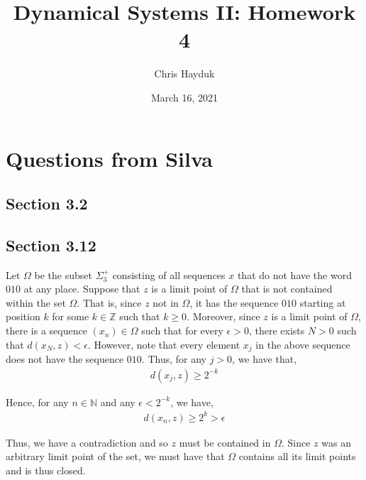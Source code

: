 \documentclass[12pt]{article}
\newenvironment{problem}[2][Problem]{\begin{trivlist}
\item[\hskip \labelsep {\bfseries #1}\hskip \labelsep {\bfseries #2.}]}{\end{trivlist}}
\begin{document}
\title{Dynamical Systems II: Homework 4}

\author{Chris Hayduk}
\date{March 16, 2021}

\maketitle

\section{Questions from Silva}

\subsection{Section 3.2}

\begin{problem}{10}
\end{problem}

\subsection{Section 3.12}

\begin{problem}{2}
\end{problem}

Let $\Omega$ be the subset $\Sigma^+_3$ consisting of all sequences $x$ that do not have the word $010$ at any place. Suppose that $z$ is a limit point of $\Omega$ that is not contained within the set $\Omega$. That is, since $z$ not in $\Omega$, it has the sequence $010$ starting at position $k$ for some $k \in \mathbb{Z}$ such that $k \geq 0$. Moreover, since $z$ is a limit point of $\Omega$, there is a sequence $(x_n) \in \Omega$ such that for every $\epsilon > 0$, there exists $N > 0$ such that $d(x_N, z) < \epsilon$. However, note that every element $x_j$ in the above sequence does not have the sequence $010$. Thus, for any $j > 0$, we have that,
\begin{align*}
d(x_j, z) \geq 2^{-k}
\end{align*}

Hence, for any $n \in \mathbb{N}$ and any $\epsilon < 2^{-k}$, we have,
\begin{align*}
d(x_n, z) \geq 2^k > \epsilon
\end{align*}

Thus, we have a contradiction and so $z$ must be contained in $\Omega$. Since $z$ was an arbitrary limit point of the set, we must have that $\Omega$ contains all its limit points and is thus closed.
\end{document}
